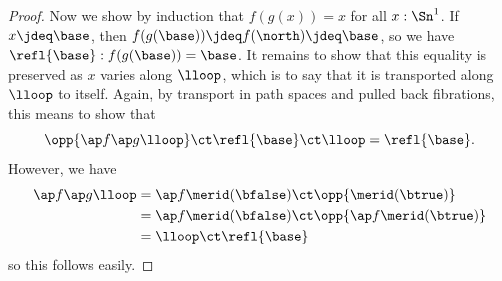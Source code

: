 \begin{proof}
  Now we show by induction that $f(g(x))=x$ for all $x:\Sn^1$.
  If $x\jdeq \base$, then $f(g(\base))\jdeq f(\north)\jdeq\base$, so we have $\refl{\base} : f(g(\base))=\base$.
  It remains to show that this equality is preserved as $x$ varies along $\lloop$, which is to say that it is transported along $\lloop$ to itself.
  Again, by transport in path spaces and pulled back fibrations, this means to show that
  \[ \opp{\ap f {\ap g {\lloop}}} \ct \refl{\base} \ct \lloop = \refl{\base}.\]
  However, we have
  \begin{align*}
    \ap f {\ap g {\lloop}} &= \ap f {\merid(\bfalse) \ct \opp{\merid(\btrue)}}\\
    &= \ap f {\merid(\bfalse)} \ct \opp{\ap f {\merid(\btrue)}}\\
    &= \lloop \ct \refl{\base}
  \end{align*}
  so this follows easily.
\end{proof}
